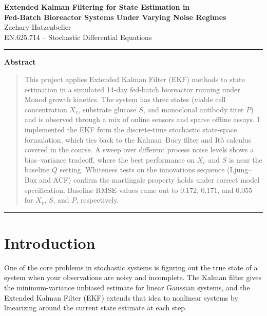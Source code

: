 \documentclass[11pt,letterpaper]{article}
\newcommand{\xv}{X_{v}}
\begin{document}
\begin{center}
    {\LARGE\bfseries Extended Kalman Filtering for State Estimation in\\[4pt]
    Fed-Batch Bioreactor Systems Under Varying Noise Regimes}\\[10pt]
    {\large Zachary Hatzenbeller}\\[2pt]
    {\normalsize EN.625.714 -- Stochastic Differential Equations}
\end{center}
\vspace{4pt}
\hrule
\vspace{6pt}

\begin{center}\textbf{Abstract}\end{center}
\begin{quotation}\noindent
This project applies Extended Kalman Filter (EKF) methods to state estimation in a simulated
14-day fed-batch bioreactor running under Monod growth kinetics. The system has three states
(viable cell concentration $\xv$, substrate glucose $S$, and monoclonal antibody titer $P$)
and is observed through a mix of online sensors and sparse offline assays. I implemented the
EKF from the discrete-time stochastic state-space formulation, which ties back to the
Kalman--Bucy filter and It\^{o} calculus covered in the course. A sweep over different process
noise levels shows a bias--variance tradeoff, where the best performance on $\xv$ and $S$ is
near the baseline $Q$ setting. Whiteness tests on the innovations sequence (Ljung--Box and ACF)
confirm the martingale property holds under correct model specification. Baseline RMSE values
came out to $0.172$, $0.171$, and $0.055$ for $\xv$, $S$, and $P$, respectively.
\end{quotation}
\vspace{4pt}
\hrule
\vspace{8pt}

\section{Introduction}

One of the core problems in stochastic systems is figuring out the true state of a system
when your observations are noisy and incomplete. The Kalman filter gives the minimum-variance
unbiased estimate for linear Gaussian systems, and the Extended Kalman Filter (EKF) extends
that idea to nonlinear systems by linearizing around the current state estimate at each step.
\end{document}
